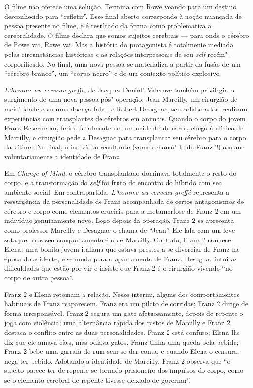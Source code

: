 O filme não oferece uma solução. Termina com Rowe voando para um destino
desconhecido para ``refletir''. Esse final aberto corresponde à noção
nuançada de pessoa presente no filme, e é resultado da forma como
problematiza a cerebralidade. O filme declara que somos sujeitos
cerebrais --- para onde o cérebro de Rowe vai, Rowe vai. Mas a história
do protagonista é totalmente mediada pelas circunstâncias históricas e
as relações interpessoais de seu \emph{self} recém"-corporificado. No final, uma
nova pessoa se materializa a partir da fusão de um ``cérebro branco'',
um ``corpo negro'' e de um contexto político explosivo.

\emph{L'homme au cerveau greffé}, de Jacques Doniol"-Valcroze também
privilegia o surgimento de uma nova pessoa pós"-operação. Jean Marcilly,
um cirurgião de meia"-idade com uma doença fatal, e Robert Desagnac, seu
colaborador, realizam experiências com transplantes de cérebros em
animais. Quando o corpo do jovem Franz Eckermann, ferido fatalmente em
um acidente de carro, chega à clínica de Marcilly, o cirurgião pede a
Desagnac para transplantar seu cérebro para o corpo da vítima. No final,
o indivíduo resultante (vamos chamá"-lo de Franz 2) assume
voluntariamente a identidade de Franz.

Em \emph{Change of Mind,} o cérebro transplantado dominava totalmente o
resto do corpo, e a transformação do \emph{self} foi fruto do encontro do
híbrido com seu ambiente social. Em contrapartida, \emph{L'homme au
cerveau greffé} representa a ressurgência da personalidade de Franz
acompanhada de certos antagonismos de cérebro e corpo como elementos
cruciais para a metamorfose de Franz 2 em um indivíduo genuinamente
novo. Logo depois da operação, Franz 2 se apresenta como professor
Marcilly e Desagnac o chama de ``Jean''. Ele fala com um leve sotaque,
mas seu comportamento é o de Marcilly. Contudo, Franz 2 conhece Elena,
uma bonita jovem italiana que estava prestes a se divorciar de Franz na
época do acidente, e se muda para o apartamento de Franz. Desagnac intui
as dificuldades que estão por vir e insiste que Franz 2 é o cirurgião
vivendo ``no corpo de outra pessoa''.

Franz 2 e Elena retomam a relação. Nesse ínterim, alguns dos
comportamentos habituais de Franz reaparecem. Franz era um piloto de
corridas; Franz 2 dirige de forma irresponsável. Franz 2 segura um gato
afetuosamente, depois de repente o joga com violência; uma alternância
rápida dos rostos de Marcilly e Franz 2 destaca o conflito entre as duas
personalidades. Franz 2 está confuso; Elena lhe diz que ele amava cães,
mas odiava gatos. Franz tinha uma queda pela bebida; Franz 2 bebe uma
garrafa de rum sem se dar conta, e quando Elena o censura, nega ter
bebido. Adotando a identidade de Marcilly, Franz 2 observa que ``o sujeito parece
ter de repente se tornado prisioneiro dos impulsos do corpo, como se o
elemento cerebral de repente tivesse deixado de governar''.

